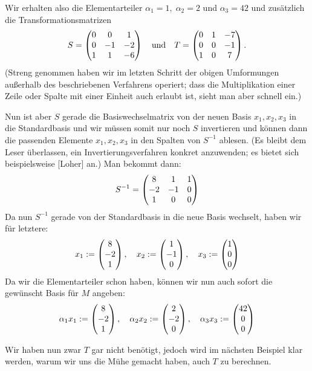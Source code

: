\begin{thBeisp}
    \medskip
    Wir erhalten also die Elementarteiler $\alpha_1 = 1,\; \alpha_2 = 2$ und
    $\alpha_3 = 42$ und zusätzlich die Transformationsmatrizen
    \[ S = \begin{pmatrix} 
             0 &  0 &  1 \\
             0 & -1 & -2 \\
             1 &  1 & -6   \end{pmatrix} 
       \quad\text{und}\quad
       T = \begin{pmatrix} 
             0 &  1 & -7 \\
             0 &  0 & -1 \\
             1 &  0 &  7   \end{pmatrix}
    . \]
    (Streng genommen haben wir im letzten Schritt der obigen Umformungen
    außerhalb des beschriebenen Verfahrens operiert; dass die Multiplikation
    einer Zeile oder Spalte mit einer Einheit auch erlaubt ist, sieht man aber
    schnell ein.)
    
    Nun ist aber $S$ gerade die Basiswechselmatrix von der neuen Basis
    $x_1,x_2,x_3$ in die Standardbasis und wir müssen somit nur noch $S$
    invertieren und können dann die passenden Elemente $x_1,x_2,x_3$ in den Spalten
    von $S^{-1}$ ablesen. (Es bleibt dem Leser überlassen, ein
    Invertierungsverfahren konkret anzuwenden; es bietet sich beispielsweise
    [Loher] %
    an.) Man bekommt dann:
    \[ S^{-1} = \begin{pmatrix} 
                     8 &  1 & 1 \\
                    -2 & -1 & 0 \\
                     1 &  0 & 0   \end{pmatrix}  \]
    Da nun $S^{-1}$ gerade von der Standardbasis in die neue Basis wechselt,
    haben wir für letztere:
    \[
        x_1 := \begin{pmatrix} 8\\-2\\1 \end{pmatrix}, \quad 
        x_2 := \begin{pmatrix} 1\\-1\\0 \end{pmatrix}, \quad
        x_3 := \begin{pmatrix} 1\\ 0\\0 \end{pmatrix}    \]
    Da wir die Elementarteiler schon haben, können wir nun auch sofort die
    gewünscht Basis für $M$ angeben:
    \[
        \alpha_1 x_1 := \begin{pmatrix} 8\\-2\\1 \end{pmatrix}, \quad 
        \alpha_2 x_2 := \begin{pmatrix} 2\\-2\\0 \end{pmatrix}, \quad
        \alpha_3 x_3 := \begin{pmatrix} 42\\0\\0 \end{pmatrix}    \]

    Wir haben nun zwar $T$ gar nicht benötigt, jedoch wird im nächsten Beispiel 
    klar werden, warum wir uns die Mühe gemacht haben, auch $T$ zu berechnen.
\end{thBeisp}

